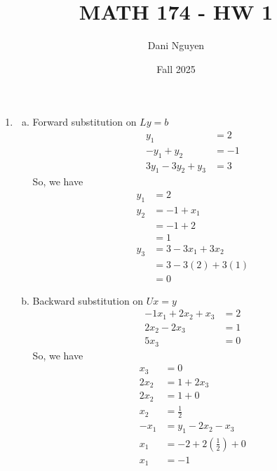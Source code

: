 \documentclass[12pt, letterpaper]{article}
\title{MATH 174 - HW 1}
\author{Dani Nguyen}
\date{Fall 2025}
\begin{document}
\maketitle

\begin{enumerate}
    \item %
        \begin{enumerate}[(a)]
            \item Forward substitution on $Ly=b$
                \begin{align*}
                    y_1               &= 2  \\
                    -y_1 + y_2        &= -1 \\
                    3y_1 - 3y_2 + y_3 &= 3
                \end{align*}
                So, we have 
                \begin{align*}
                    y_1 &= 2 \\
                    y_2 &= -1 + x_1 \\
                        &= -1 + 2 \\
                        &= 1 \\
                    y_3 &= 3 - 3x_1 + 3x_2 \\
                        &= 3 - 3(2) + 3(1) \\
                        &= 0
                \end{align*}
            \item Backward substitution on $Ux=y$
                \begin{align*}
                    -1x_1 + 2x_2 + x_3 &= 2  \\
                    2x_2 - 2x_3 &= 1 \\
                    5x_3 &= 0
                \end{align*}
                So, we have
                \begin{align*}
                    x_3 &= 0 \\
                    2x_2 &= 1 + 2x_3 \\
                    2x_2 &= 1 + 0 \\
                    x_2  &= \frac{1}{2} \\
                    -x_1 &= y_1 - 2x_2 - x_3 \\
                    x_1 &= -2+2(\frac{1}{2})+0 \\ 
                    x_1 &= -1
                \end{align*}

\end{enumerate}
\end{enumerate}
\end{document}
